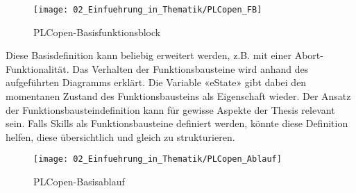 	\newpage
	
	\begin{figure}[h!]
		\centering
		\texttt{[image: 02\_Einfuehrung\_in\_Thematik/PLCopen\_FB]}
		\captionsetup{justification=centering}
		\caption{PLCopen-Basisfunktionsblock}
		\label{fig:PLCopen_FB}
	\end{figure}
	
	Diese Basisdefinition kann beliebig erweitert werden, z.B. mit einer Abort-Funktionalität. Das Verhalten der Funktionsbausteine wird anhand des aufgeführten Diagramms erklärt. Die Variable «eState» gibt dabei den momentanen Zustand des Funktionsbausteins als Eigenschaft wieder.
	Der Ansatz der Funktionsbausteindefinition kann für gewisse Aspekte der Thesis relevant sein. Falls Skills als Funktionsbausteine definiert werden, könnte diese Definition helfen, diese übersichtlich und gleich zu strukturieren. 
	
	\begin{figure}[h!]
		\centering
		\texttt{[image: 02\_Einfuehrung\_in\_Thematik/PLCopen\_Ablauf]}
		\captionsetup{justification=centering}
		\caption{PLCopen-Basisablauf}
		\label{fig:PLCopen_Ablauf}
	\end{figure}
	
	\newpage
	
	
	